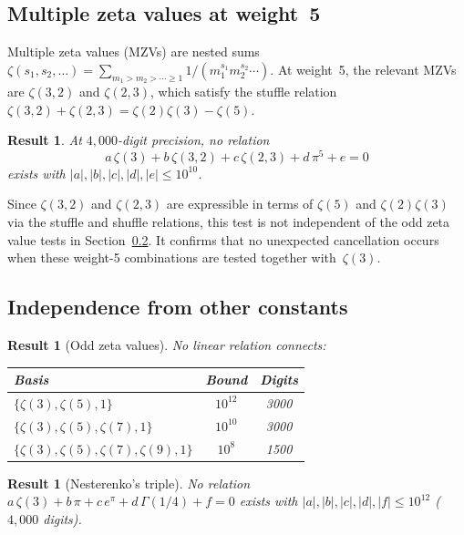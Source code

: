 \documentclass[12pt]{article}
\newtheorem{result}[theorem]{Result}
\theoremstyle{definition}
\theoremstyle{remark}
\begin{document}
\subsection{Multiple zeta values at weight~5}\label{sec:mzv}

Multiple zeta values (MZVs) are nested sums
$\zeta(s_1,s_2,\ldots)=\sum_{m_1>m_2>\cdots\ge 1}
1/(m_1^{s_1}m_2^{s_2}\cdots)$.  At weight~5, the relevant MZVs are
$\zeta(3,2)$ and $\zeta(2,3)$, which satisfy the stuffle relation
$\zeta(3,2)+\zeta(2,3)=\zeta(2)\zeta(3)-\zeta(5)$.

\begin{result}\label{res:mzv}
At $4{,}000$-digit precision, no relation
\[
  a\,\zeta(3)+b\,\zeta(3,2)+c\,\zeta(2,3)+d\,\pi^5+e=0
\]
exists with $|a|,|b|,|c|,|d|,|e|\le 10^{10}$.
\end{result}

\noindent Since $\zeta(3,2)$ and $\zeta(2,3)$ are expressible in
terms of $\zeta(5)$ and $\zeta(2)\zeta(3)$ via the stuffle and shuffle
relations, this test is not independent of the odd zeta value tests in
Section~\ref{sec:other-constants}.  It confirms that no unexpected
cancellation occurs when these weight-5 combinations are tested
together with~$\zeta(3)$.


\subsection{Independence from other constants}\label{sec:other-constants}

\begin{result}[Odd zeta values]\label{res:odd-zeta}
No linear relation connects:
\begin{center}
\begin{tabular}{@{}lcc@{}}
\toprule
Basis & Bound & Digits \\
\midrule
$\{\zeta(3),\zeta(5),1\}$ & $10^{12}$ & 3000 \\
$\{\zeta(3),\zeta(5),\zeta(7),1\}$ & $10^{10}$ & 3000 \\
$\{\zeta(3),\zeta(5),\zeta(7),\zeta(9),1\}$ & $10^{8}$ & 1500 \\
\bottomrule
\end{tabular}
\end{center}
\end{result}

\begin{result}[Nesterenko's triple]\label{res:nesterenko}
No relation $a\,\zeta(3)+b\,\pi+c\,e^\pi+d\,\Gamma(1/4)+f=0$ exists
with $|a|,|b|,|c|,|d|,|f|\le 10^{12}$ ($4{,}000$ digits).
\end{result}
\end{document}
